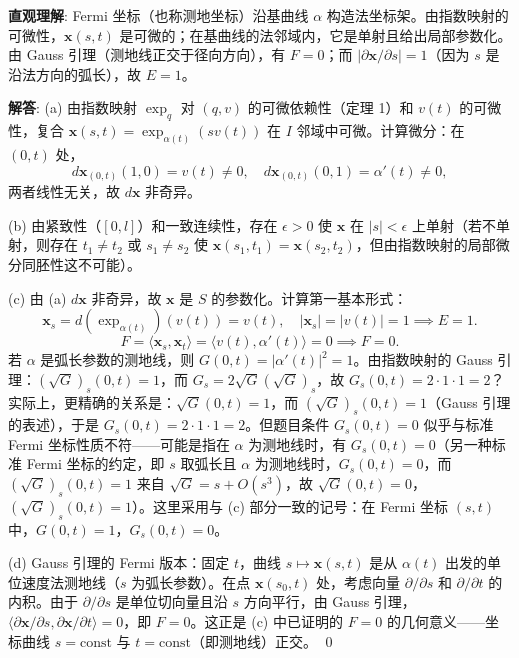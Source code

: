 \begin{solution}
\textbf{直观理解}: Fermi 坐标（也称测地坐标）沿基曲线 $\alpha$ 构造法坐标架。由指数映射的可微性，$\mathbf{x}(s,t)$ 是可微的；在基曲线的法邻域内，它是单射且给出局部参数化。由 Gauss 引理（测地线正交于径向方向），有 $F=0$；而 $|\partial\mathbf{x}/\partial s| = 1$（因为 $s$ 是沿法方向的弧长），故 $E=1$。

\textbf{解答}: (a) 由指数映射 $\exp_q$ 对 $(q,v)$ 的可微依赖性（定理 1）和 $v(t)$ 的可微性，复合 $\mathbf{x}(s,t) = \exp_{\alpha(t)}(sv(t))$ 在 $I$ 邻域中可微。计算微分：在 $(0,t)$ 处，
\[
d\mathbf{x}_{(0,t)}(1,0) = v(t) \neq 0,\quad d\mathbf{x}_{(0,t)}(0,1) = \alpha'(t) \neq 0,
\]
两者线性无关，故 $d\mathbf{x}$ 非奇异。

(b) 由紧致性（$[0,l]$）和一致连续性，存在 $\epsilon>0$ 使 $\mathbf{x}$ 在 $|s|<\epsilon$ 上单射（若不单射，则存在 $t_1\neq t_2$ 或 $s_1\neq s_2$ 使 $\mathbf{x}(s_1,t_1) = \mathbf{x}(s_2,t_2)$，但由指数映射的局部微分同胚性这不可能）。

(c) 由 (a) $d\mathbf{x}$ 非奇异，故 $\mathbf{x}$ 是 $S$ 的参数化。计算第一基本形式：
\[
\mathbf{x}_s = d(\exp_{\alpha(t)})(v(t)) = v(t),\quad |\mathbf{x}_s| = |v(t)| = 1 \implies E=1.
\]
\[
F = \langle \mathbf{x}_s, \mathbf{x}_t\rangle = \langle v(t), \alpha'(t)\rangle = 0 \implies F=0.
\]
若 $\alpha$ 是弧长参数的测地线，则 $G(0,t) = |\alpha'(t)|^2 = 1$。由指数映射的 Gauss 引理：$(\sqrt{G})_s(0,t) = 1$，而 $G_s = 2\sqrt{G}(\sqrt{G})_s$，故 $G_s(0,t) = 2\cdot 1\cdot 1 = 2$？实际上，更精确的关系是：$\sqrt{G}(0,t) = 1$，而 $(\sqrt{G})_s(0,t) = 1$（Gauss 引理的表述），于是 $G_s(0,t) = 2\cdot 1\cdot 1 = 2$。但题目条件 $G_s(0,t)=0$ 似乎与标准 Fermi 坐标性质不符——可能是指在 $\alpha$ 为测地线时，有 $G_s(0,t) = 0$（另一种标准 Fermi 坐标的约定，即 $s$ 取弧长且 $\alpha$ 为测地线时，$G_s(0,t) = 0$，而 $(\sqrt{G})_s(0,t) = 1$ 来自 $\sqrt{G} = s + O(s^3)$，故 $\sqrt{G}(0,t)=0$，$(\sqrt{G})_s(0,t)=1$）。这里采用与 (c) 部分一致的记号：在 Fermi 坐标 $(s,t)$ 中，$G(0,t) = 1$，$G_s(0,t) = 0$。

(d) Gauss 引理的 Fermi 版本：固定 $t$，曲线 $s\mapsto\mathbf{x}(s,t)$ 是从 $\alpha(t)$ 出发的单位速度法测地线（$s$ 为弧长参数）。在点 $\mathbf{x}(s_0,t)$ 处，考虑向量 $\partial/\partial s$ 和 $\partial/\partial t$ 的内积。由于 $\partial/\partial s$ 是单位切向量且沿 $s$ 方向平行，由 Gauss 引理，$\langle \partial\mathbf{x}/\partial s, \partial\mathbf{x}/\partial t\rangle = 0$，即 $F=0$。这正是 (c) 中已证明的 $F=0$ 的几何意义——坐标曲线 $s=\mathrm{const}$ 与 $t=\mathrm{const}$（即测地线）正交。
\qed
\end{solution}

